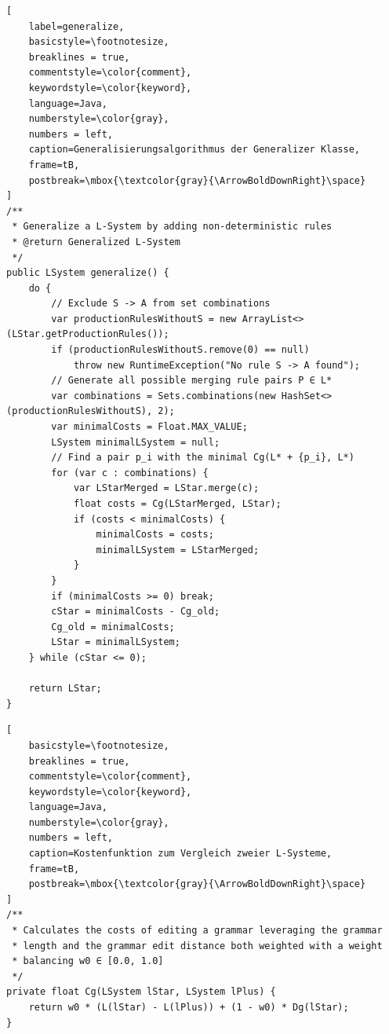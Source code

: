 \newpage

\begin{lstlisting}[
    label=generalize,
    basicstyle=\footnotesize,
    breaklines = true,
    commentstyle=\color{comment},
    keywordstyle=\color{keyword},
    language=Java,
    numberstyle=\color{gray},
    numbers = left,
    caption=Generalisierungsalgorithmus der Generalizer Klasse,
    frame=tB,
    postbreak=\mbox{\textcolor{gray}{\ArrowBoldDownRight}\space}
]
/**
 * Generalize a L-System by adding non-deterministic rules
 * @return Generalized L-System
 */
public LSystem generalize() {
    do {
        // Exclude S -> A from set combinations
        var productionRulesWithoutS = new ArrayList<>(LStar.getProductionRules());
        if (productionRulesWithoutS.remove(0) == null)
            throw new RuntimeException("No rule S -> A found");
        // Generate all possible merging rule pairs P ∈ L*
        var combinations = Sets.combinations(new HashSet<>(productionRulesWithoutS), 2);
        var minimalCosts = Float.MAX_VALUE;
        LSystem minimalLSystem = null;
        // Find a pair p_i with the minimal Cg(L* + {p_i}, L*)
        for (var c : combinations) {
            var LStarMerged = LStar.merge(c);
            float costs = Cg(LStarMerged, LStar);
            if (costs < minimalCosts) {
                minimalCosts = costs;
                minimalLSystem = LStarMerged;
            }
        }
        if (minimalCosts >= 0) break;
        cStar = minimalCosts - Cg_old;
        Cg_old = minimalCosts;
        LStar = minimalLSystem;
    } while (cStar <= 0);

    return LStar;
}
\end{lstlisting}

\newpage

\begin{lstlisting}[
    basicstyle=\footnotesize,
    breaklines = true,
    commentstyle=\color{comment},
    keywordstyle=\color{keyword},
    language=Java,
    numberstyle=\color{gray},
    numbers = left,
    caption=Kostenfunktion zum Vergleich zweier L-Systeme,
    frame=tB,
    postbreak=\mbox{\textcolor{gray}{\ArrowBoldDownRight}\space}
]
/**
 * Calculates the costs of editing a grammar leveraging the grammar
 * length and the grammar edit distance both weighted with a weight
 * balancing w0 ∈ [0.0, 1.0]
 */
private float Cg(LSystem lStar, LSystem lPlus) {
    return w0 * (L(lStar) - L(lPlus)) + (1 - w0) * Dg(lStar);
}
\end{lstlisting}

